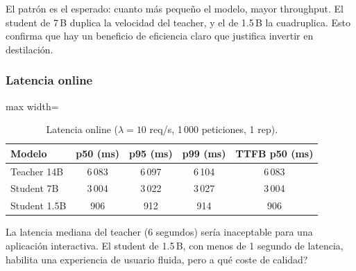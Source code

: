 \documentclass[11pt,a4paper]{article}
\begin{document}
El patr\'on es el esperado: cuanto m\'as peque\~no el modelo, mayor
throughput. El student de 7\,B duplica la velocidad del teacher, y el de
1.5\,B la cuadruplica. Esto confirma que hay un beneficio de eficiencia
claro que justifica invertir en destilaci\'on.

\subsubsection{Latencia online}

\begin{table}[H]
\centering
\caption{Latencia online ($\lambda=10$ req/s, 1\,000 peticiones, 1 rep).}
\label{tab:prelim-latency}
\begin{adjustbox}{max width=\textwidth}
\begin{tabular}{@{}lcccc@{}}
\toprule
\textbf{Modelo} & \textbf{p50 (ms)} & \textbf{p95 (ms)} & \textbf{p99 (ms)} & \textbf{TTFB p50 (ms)} \\
\midrule
\rowcolor{teacher!10}   Teacher 14B   & 6\,083 & 6\,097 & 6\,104 & 6\,083 \\
\rowcolor{midstud!10}   Student 7B    & 3\,004 & 3\,022 & 3\,027 & 3\,004 \\
\rowcolor{smallstud!10} Student 1.5B  &    906 &    912 &    914 &    906 \\
\bottomrule
\end{tabular}
\end{adjustbox}
\end{table}

La latencia mediana del teacher (6 segundos) ser\'ia inaceptable para
una aplicaci\'on interactiva. El student de 1.5\,B, con menos de 1
segundo de latencia, habilita una experiencia de usuario fluida, pero
\textquestiondown{}a qu\'e coste de calidad?
\end{document}
